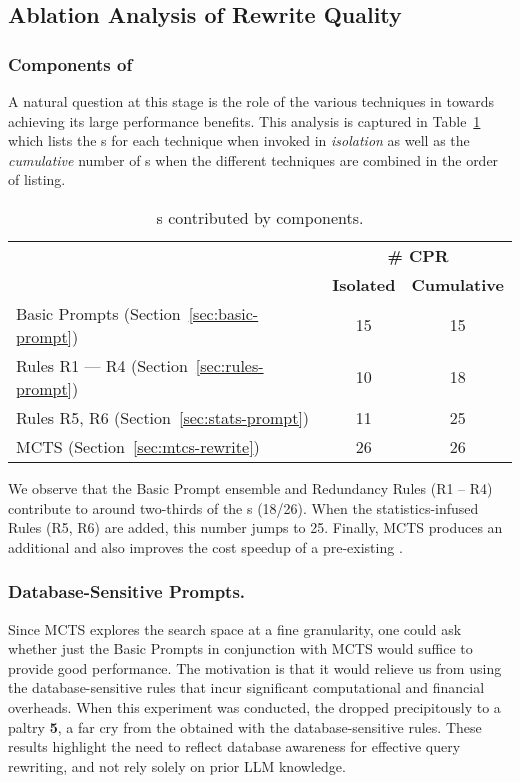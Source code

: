 \subsection{Ablation Analysis of Rewrite Quality}
\label{sec:ablation}

\subsubsection{Components of  {\lithe}}
A natural question at this stage is the role of the various techniques in \lithe towards achieving its large performance benefits. This analysis is captured in Table~\ref{tab:lithe-contribution} which lists the {\cpr}s for each technique when invoked in \emph{isolation} as well as the \emph{cumulative} number of {\cpr}s when the different techniques are combined in the order of listing.

\begin{table}[h]
\footnotesize
\centering
\caption{{\cpr}s contributed by \lithe components.}
\label{tab:lithe-contribution}
\begin{tabular}{|l|c|c|} \hline
 & \multicolumn{2}{c|}{\textbf{\# CPR}} \\
 & \textbf{Isolated} & \textbf{Cumulative}  \\ \hline \hline
Basic Prompts (Section~\ref{sec:basic-prompt}) & 15  & 15  \\ \hline
Rules R1 --- R4 (Section~\ref{sec:rules-prompt}) & 10 & 18  \\ \hline 
Rules R5, R6 (Section~\ref{sec:stats-prompt})    & 11 & 25  \\ \hline %
MCTS (Section~\ref{sec:mtcs-rewrite})            & 26 & 26 \\ \hline 
\end{tabular}
\end{table}
%

We observe that the Basic Prompt ensemble and Redundancy Rules (R1 -- R4) contribute to around two-thirds of the {\cpr}s (18/26). When the statistics-infused Rules (R5, R6) are added, this number jumps to 25. Finally, MCTS produces an additional \cpr and also improves the cost speedup of a pre-existing \cpr.
%

\subsubsection{Database-Sensitive Prompts.}
%
Since MCTS explores the search space at a fine granularity, one could ask whether just the Basic Prompts in conjunction with MCTS would suffice to provide good performance. The motivation is that it would relieve us from using the database-sensitive rules 
that incur significant computational and financial overheads. When this experiment was conducted, the \csgm dropped precipitously to a paltry \textbf{5}, a far cry from the \gmLitheAllDS obtained with the database-sensitive rules. These results highlight the need to reflect database awareness for effective query rewriting, and not rely solely on prior LLM knowledge.


